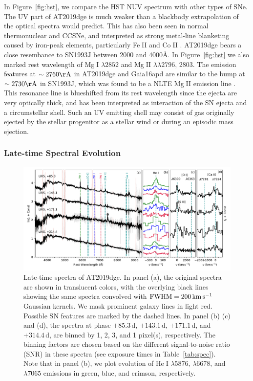 \documentclass[twocolumn]{aastex63}
\def\ion#1#2{#1$\;${\footnotesize\rm{#2}}\relax}
\begin{document}
\begin{CJK*}{UTF8}{gbsn}
In Figure~\ref{fig:hst}, we compare the HST NUV spectrum with other types of SNe. 
The UV part of AT2019dge is much weaker than a blackbody extrapolation of the optical spectra would 
predict. This has also been seen in normal thermonuclear and CCSNe, and interpreted as strong 
metal-line blanketing caused by iron-peak elements, particularly \ion{Fe}{II} and \ion{Co}{II} 
\citep{Gal-Yam2008}. AT2019dge bears a close resembance to SN1993J between 2000 and 4000\AA. 
In Figure~\ref{fig:hst} we also marked rest wavelength of \ion{Mg}{I} $\lambda2852$ and \ion{Mg}{II} 
$\lambda \lambda 2796$, 2803. The emission features at $\sim2760{\rm \AA}$ in AT2019dge and 
Gaia16apd are similar to the bump at $\sim2730{\rm \AA}$ in SN1993J, which was found to be a NLTE 
\ion{Mg}{II} emission line \citep{Jeffery1994}. This resonance line is blueshifted from its rest wavelength 
since the ejecta are very optically thick, and has been interpreted as interaction of the SN ejecta and a
circumstellar shell. Such an UV emitting shell may consist of gas originally ejected by the 
stellar progenitor as a stellar wind or during an episodic mass ejection. 

\subsubsection{Late-time  Spectral Evolution}
\begin{figure}[htbp!]
	\centering
	\includegraphics[width=\textwidth]{figures/spectra_late.pdf}
	\caption{Late-time spectra of AT2019dge. In panel (a), the original spectra are	
		shown in translucent colors, with the overlying black 
		lines showing the same spectra convolved with ${\rm FWHM} = 200\, {\rm km\, 
			s^{-1}}$ Gaussian kernels. We mask prominent galaxy lines in light red. Possible SN features are 
			marked by the dashed lines. In panel (b) (c) and (d), 
			 the spectra at phase $+85.3$\,d, $+143.1$\,d, $+171.1$\,d, and $+314.4$\,d, are 
			 binned by 1, 2, 3, and 1 pixel(s), respectively. The binning factors are chosen based on the 
			 different signal-to-noise ratio (SNR) in these spectra (see exposure times in 
			 Table~\ref{tab:spec}). Note that in panel (b), we plot evolution of \ion{He}{I} $\lambda 5876$, 
			 $\lambda 6678$, and $\lambda 7065$ emissions in green, blue, and crimson, respectively.
		\label{fig:spectra_late}}
\end{figure}


\end{CJK*}
\end{document}
